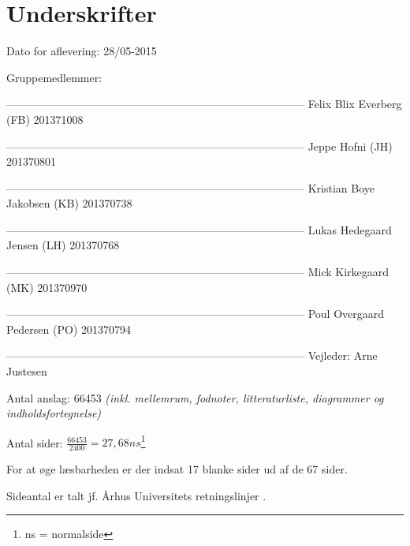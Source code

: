 \chapter*{Underskrifter}

Dato for aflevering: 28/05-2015

Gruppemedlemmer: \newline


--------------------------------------------------------------------------------- \newline
Felix Blix Everberg (FB) 201371008\newline



--------------------------------------------------------------------------------- \newline
Jeppe Hofni (JH) 201370801\newline



--------------------------------------------------------------------------------- \newline
Kristian Boye Jakobsen (KB) 201370738\newline



--------------------------------------------------------------------------------- \newline
Lukas Hedegaard Jensen (LH) 201370768\newline



--------------------------------------------------------------------------------- \newline
Mick Kirkegaard (MK) 201370970\newline



--------------------------------------------------------------------------------- \newline
Poul Overgaard Pedersen (PO) 201370794\newline













--------------------------------------------------------------------------------- \newline
Vejleder: Arne Justesen \newline


\vspace{1cm}

Antal anslag: 66453\newline
\textit{(inkl. mellemrum, fodnoter, litteraturliste, diagrammer og indholdsfortegnelse)}

Antal sider: $\frac { 66453 }{ 2400 } = 27,68ns$\footnote{ns = normalside}

For at øge læsbarheden er der indsat 17 blanke sider ud af de 67 sider.

Sideantal er talt jf. Århus Universitets retningslinjer \citep*{aau:formalia}.


\afterpage{\null\newpage}

